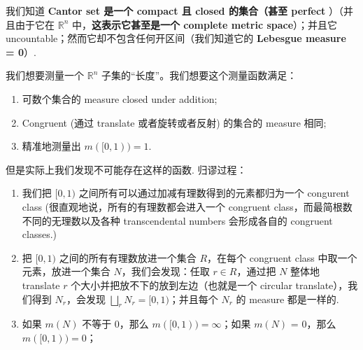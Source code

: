 \documentclass[lang=cn,11pt]{elegantbook}
\begin{document}
\noindent 我们知道\textbf{ Cantor set 是一个 compact 且 closed 的集合（甚至 perfect }）（并且由于它在  $\mathbb{R}^n$ 中，\textbf{这表示它甚至是一个 complete metric space}）；并且它 uncountable；然而它却不包含任何开区间（我们知道它的 \textbf{Lebesgue measure = 0}）.

\noindent 我们想要测量一个 $\mathbb{R}^n$ 子集的“长度”。我们想要这个测量函数满足：

\begin{enumerate}
    \item  可数个集合的 measure closed under addition;
    \item  Congruent (通过 translate 或者旋转或者反射) 的集合的 measure 相同; 
    \item  精准地测量出 $m([0,1)) = 1$. 
\end{enumerate}


\noindent 但是实际上我们发现不可能存在这样的函数. 
\noindent 归谬过程：
   \begin{enumerate}
       \item   我们把 $[0,1)$ 之间所有可以通过加减有理数得到的元素都归为一个 congurent class (很直观地说，所有的有理数都会进入一个 congruent class，而最简根数不同的无理数以及各种 transcendental numbers 会形成各自的 congruent classes.)
       \item  把 $[0,1)$ 之间的所有有理数放进一个集合 $R$，在每个 congruent class 中取一个元素，放进一个集合 $N$，我们会发现：任取 $r \in R$，通过把 $N$ 整体地 translate $r$ 个大小并把放不下的放到左边（也就是一个 circular translate），我们得到 $N_r$，会发现 $\bigsqcup_{r} N_r = [0,1)$；并且每个 $N_r$ 的 measure 都是一样的.
       \item   如果 $m(N)$ 不等于 0，那么 $m([0,1)) = \infty$；如果 $m(N)$ = 0，那么 $m([0,1)) = 0$；
   \end{enumerate}
\end{document}

